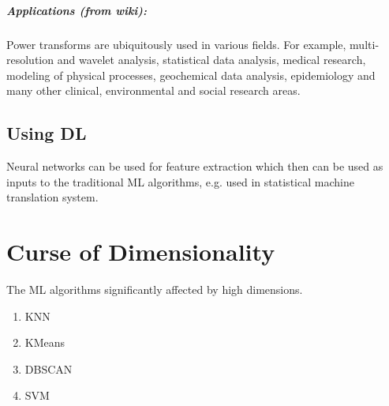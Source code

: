 \documentclass[a4paper, 12pt]{report}
\begin{document}
\paragraph{Applications (from wiki):} Power transforms are ubiquitously used in various fields. For example, multi-resolution and wavelet analysis, statistical data analysis, medical research, modeling of physical processes, geochemical data analysis, epidemiology and many other clinical, environmental and social research areas.

\section{Using DL}
Neural networks can be used for feature extraction which then can be used as inputs to the traditional ML algorithms, e.g. used in statistical machine translation system.

\chapter{Curse of Dimensionality}
The ML algorithms significantly affected by high dimensions.

\begin{enumerate}
\item KNN
\item KMeans
\item DBSCAN
\item SVM
\end{enumerate}
\end{document}
